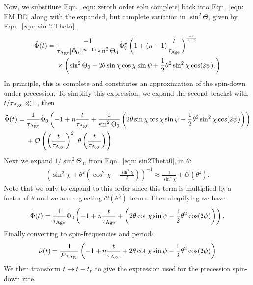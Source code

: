 \documentclass[../full_thesis/full_thesis.tex]{subfiles}
\begin{document}
\begin{subappendices}
Now, we substiture Eqn.~\eqref{eqn: zeroth order soln complete} back into
Eqn.~\eqref{eqn: EM DE} along with the expanded, but complete variation in
$\sin^{2}\Theta$, given by Eqn.~\eqref{eqn: sin 2 Theta}.
\begin{align}
\begin{split}
\ddot{\Phi}(t)  = {} & \frac{-1}{\tau_{\mathrm{Age}} |\dot{\Phi}_0|^{(n-1)} \sin^{2}\Theta_0}
\dot{\Phi}_0^n\left(1 + (n-1)\frac{t}{\tau_{\mathrm{Age}}}\right)^{\frac{-n}{1-n}} \\
& \times \left(\sin^{2}\Theta_0
- 2\theta \sin\chi\cos\chi \sin\psi
 + \frac{1}{2}\theta^{2}\sin^{2}\chi\cos(2\psi).
\right)
\end{split}
\end{align}
In principle, this is complete and constitutes an approximation of the spin-down
under precession.
To simplify this expression, we expand the second bracket with $t/\tau_{\mathrm{Age}}\ll1$, then
\begin{align}
\begin{split}
\ddot{\Phi}(t) = {} & \frac{1}{\tau_{\mathrm{Age}}} \dot{\Phi}_0
\left(-1 + n\frac{t}{\tau_{\mathrm{Age}}} +
\frac{1}{\sin^{2}\Theta_0}\left(
2\theta \sin\chi\cos\chi \sin\psi
- \frac{1}{2}\theta^{2}\sin^{2}\chi\cos(2\psi)
\right)\right) \\
& +
\mathcal{O}\left(\left(\frac{t}{\tau_{\mathrm{Age}}}\right)^{2},
                 \theta\left(\frac{t}{\tau_{\mathrm{Age}}}\right)\right)
\end{split}
\end{align}
Next we expand $1/\sin^{2}\Theta_0$, from Eqn.~\eqref{eqn: sin2Theta0}, in $\theta$:
\begin{align}
\left(\sin^{2}\chi + \theta^{2}\left(\cos^{2}\chi - \frac{\sin^{2}\chi}{2}\right)\right)^{-1}
\approx
\frac{1}{\sin^{2}\chi} + \mathcal{O}(\theta^{2}).
\end{align}
Note that we only to expand to this order since this term is multiplied by a
factor of $\theta$ and we are neglecting $\mathcal{O}(\theta^{3})$ terms.
Then simpifying we have
\begin{align}
\ddot{\Phi}(t) = \frac{1}{\tau_{\mathrm{Age}}} \dot{\Phi}_0
\left(-1 + n \frac{t}{\tau_{\mathrm{Age}}} +
\left( 2\theta \cot\chi \sin\psi
- \frac{1}{2}\theta^{2}\cos(2\psi)
\right)\right).
\end{align}
Finally converting to spin-frequencies and periods
\begin{align}
\dot{\nu}(t) = \frac{1}{P\tau_{\mathrm{Age}}}
\left(-1 + n \frac{t}{\tau_{\mathrm{Age}}} +
2\theta \cot\chi \sin\psi
- \frac{1}{2}\theta^{2}\cos(2\psi)
\right)
\end{align}
We then transform $t\rightarrow t-t_{\textrm{r}}$ to give the expression used for
the precession spin-down rate.


\end{subappendices}
\end{document}

